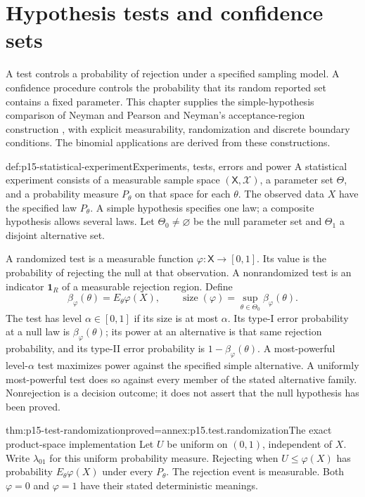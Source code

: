 \chapter{Hypothesis tests and confidence sets}
\label{sec:p15-hypothesis-tests-confidence}

A test controls a probability of rejection under a specified sampling
model. A confidence procedure controls the probability that its random
reported set contains a fixed parameter. This chapter supplies the
simple-hypothesis comparison of Neyman and Pearson
\cite[pp.~293--301]{NeymanPearson1933Tests} and Neyman's acceptance-region
construction \cite[pp.~347--355]{Neyman1937Confidence}, with explicit
measurability, randomization and discrete boundary conditions.
The binomial applications are derived from these constructions.

\begin{hbdefinition}{def:p15-statistical-experiment}{Experiments, tests, errors and power}
A statistical experiment consists of a measurable sample space
\((\mathsf X,\mathscr X)\), a parameter set \(\Theta\), and a
probability measure \(P_\theta\) on that space for each \(\theta\).
The observed data \(X\) have the specified law \(P_\theta\).
A simple hypothesis specifies one law; a composite hypothesis
allows several laws. Let \(\Theta_0\ne\varnothing\) be the null
parameter set and \(\Theta_1\) a disjoint alternative set.

A randomized test is a measurable function
\(\varphi:\mathsf X\to[0,1]\). Its value is the probability of
rejecting the null at that observation. A nonrandomized test is
an indicator \(\mathbf1_R\) of a measurable rejection region.
Define
\[
 \beta_\varphi(\theta)=E_\theta\varphi(X),\qquad
 \operatorname{size}(\varphi)=\sup_{\theta\in\Theta_0}\beta_\varphi(\theta).
\]
The test has level \(\alpha\in[0,1]\) if its size is at most
\(\alpha\). Its type-I error probability at a null law is
\(\beta_\varphi(\theta)\); its power at an alternative is that
same rejection probability, and its type-II error probability
is \(1-\beta_\varphi(\theta)\).
A most-powerful level-\(\alpha\) test maximizes power against
the specified simple alternative. A uniformly most-powerful
test does so against every member of the stated alternative family.
Nonrejection is a decision outcome; it does not assert that
the null hypothesis has been proved.
\end{hbdefinition}

\begin{hblemma}{thm:p15-test-randomization}{proved=annex:p15.test.randomization}{The exact product-space implementation}
Let \(U\) be uniform on \((0,1)\), independent of \(X\).
Write \(\lambda_{01}\) for this uniform probability measure.
Rejecting when \(U\leq\varphi(X)\) has probability
\(E_\theta\varphi(X)\) under every \(P_\theta\).
The rejection event is measurable. Both \(\varphi=0\) and
\(\varphi=1\) have their stated deterministic meanings.
\end{hblemma}

